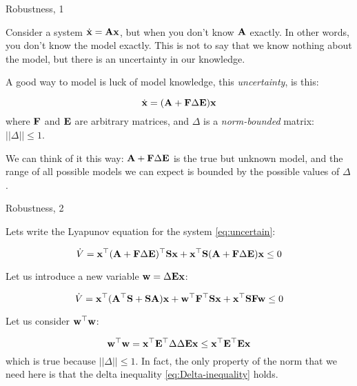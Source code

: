 \documentclass{beamer}
\begin{document}
	
	
	
	\begin{frame}{Robustness, 1}
		\begin{flushleft}
			
			Consider a system $\dot{\mathbf{x}} = \mathbf{A}\mathbf{x}$, but when you don't know $\mathbf{A}$ exactly. In other words, you don't know the model exactly. This is not to say that we know nothing about the model, but there is an uncertainty in our knowledge.
			
			\bigskip
			
			A good way to model is luck of model knowledge, this \emph{uncertainty}, is this:
			
			\begin{equation}
				\label{eq:uncertain}
				\dot{\mathbf{x}} = (\mathbf{A} + \mathbf{F} \Delta \mathbf{E})\mathbf{x}
			\end{equation}
			where $\mathbf{F}$ and $\mathbf{E}$ are arbitrary matrices, and $\Delta$ is a \emph{norm-bounded} matrix: $||\Delta|| \leq 1$.
			
			\bigskip
			
			We can think of it this way: $\mathbf{A} + \mathbf{F} \Delta \mathbf{E}$ is the true but unknown model, and the range of all possible models we can expect is bounded by the possible values of $\Delta$.
			
		\end{flushleft}
	\end{frame}
	
	
	
	\begin{frame}{Robustness, 2}
		\begin{flushleft}
			
			Lets write the Lyapunov equation for the system \eqref{eq:uncertain}:
			
			\begin{equation}
				\dot V = \mathbf{x}^\top 
				(\mathbf{A} + \mathbf{F} \Delta \mathbf{E})^\top\mathbf{S}\mathbf{x} + \mathbf{x}^\top\mathbf{S} (\mathbf{A} + \mathbf{F} \Delta \mathbf{E}) \mathbf{x} \leq 0
			\end{equation}
			
			Let us introduce a new variable $\mathbf{w} = \Delta \mathbf{E}\mathbf{x}$:
			
			\begin{equation}
				\label{eq:Lyapunov_xw}
				\dot V = \mathbf{x}^\top 
				(\mathbf{A}^\top \mathbf{S} + \mathbf{S}\mathbf{A}) \mathbf{x} + 
				\mathbf{w}^\top \mathbf{F}^\top\mathbf{S} \mathbf{x} +
				\mathbf{x}^\top \mathbf{S}\mathbf{F} \mathbf{w} \leq 0
			\end{equation}
			
			Let us consider $\mathbf{w}^\top \mathbf{w}$:
			
			\begin{equation}
				\label{eq:Delta-inequality}
				\mathbf{w}^\top \mathbf{w} = 
				\mathbf{x}^\top\mathbf{E}^\top \Delta \Delta \mathbf{E}\mathbf{x}
				\leq
				\mathbf{x}^\top\mathbf{E}^\top \mathbf{E}\mathbf{x}
			\end{equation}		
			which is true because $|| \Delta ||\leq 1$. In fact, the only property of the norm that we need here is that the delta inequality \eqref{eq:Delta-inequality} holds.
			
		\end{flushleft}
	\end{frame}
	
\end{document}
